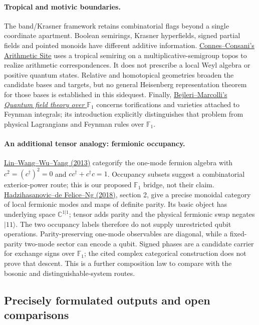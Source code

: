 \paragraph{Tropical and motivic boundaries.}
The band/Krasner framework retains combinatorial flags beyond a single
coordinate apartment. Boolean semirings, Krasner hyperfields, signed
partial fields and pointed monoids have different additive information.
\href{https://arxiv.org/abs/1405.4527}{Connes--Consani's Arithmetic Site}
uses a tropical semiring on a multiplicative-semigroup topos to realize
arithmetic correspondences. It does not prescribe a local Weyl algebra
or positive quantum states. Relative and homotopical geometries broaden
the candidate bases and targets, but no general Heisenberg representation
theorem for those bases is established in this sidequest.
Finally, \href{https://arxiv.org/abs/1209.4837}{Bejleri--Marcolli's
\emph{Quantum field theory over $\mathbb F_1$}} concerns torifications
and varieties attached to Feynman integrals; its introduction explicitly
distinguishes that problem from physical Lagrangians and Feynman rules
over $\mathbb F_1$.

\paragraph{An additional tensor analogy: fermionic occupancy.}
\href{https://arxiv.org/abs/1307.4522}{Lin--Wang--Wu--Yang (2013)}
categorify the one-mode fermion algebra with
$c^2=(c^\dagger)^2=0$ and $cc^\dagger+c^\dagger c=1$.
Occupancy subsets suggest a combinatorial exterior-power route; this
is our proposed $\mathbb F_1$ bridge, not their claim.
\href{https://doi.org/10.4230/LIPIcs.FSCD.2018.17}{Hadzihasanovic--de
Felice--Ng (2018)}, section 2, give a precise monoidal category of local
fermionic modes and maps of definite parity. Its basic object has
underlying space $\mathbb C^{1|1}$; tensor adds parity and the physical
fermionic swap negates $|11\rangle$. The two occupancy labels therefore
do not supply unrestricted qubit operations. Parity-preserving one-mode
observables are diagonal, while a fixed-parity two-mode sector can encode
a qubit. Signed phases are a candidate carrier for exchange signs over
$\mathbb F_1$; the cited complex categorical construction does not prove
that descent. This is a further composition law to compare with the
bosonic and distinguishable-system routes.

\subsection{Precisely formulated outputs and open comparisons}

